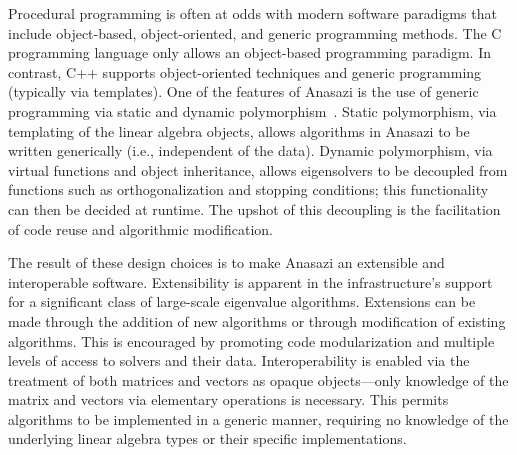 \documentclass[acmtoms]{acmtrans2m}
\newcounter{algorithm}
\begin{document}
Procedural programming is often at odds with modern software
paradigms that include object-based, object-oriented, and generic
programming methods. The C programming language only allows an
object-based programming paradigm. In contrast, C++ supports
object-oriented techniques and generic programming (typically via
templates). One of the features of Anasazi is the use of generic
programming via static and dynamic polymorphism~\cite[Chapter
14]{VJ02}. Static polymorphism, via templating of the linear algebra
objects, allows algorithms in Anasazi to be written generically
(i.e., independent of the data). Dynamic polymorphism, via virtual
functions and object inheritance, allows eigensolvers to be
decoupled from functions such as orthogonalization and stopping
conditions; this functionality can then be decided at runtime. The
upshot of this decoupling is the facilitation of code reuse and
algorithmic modification.



The result of these design choices is to make Anasazi an extensible
and interoperable software. Extensibility is apparent in the
infrastructure's support for a significant class of large-scale
eigenvalue algorithms. Extensions can be made through the addition of
new algorithms or through modification of existing algorithms. This is
encouraged by promoting code modularization and multiple levels of
access to solvers and their data. Interoperability is enabled via the
treatment of both matrices and vectors as opaque objects---only
knowledge of the matrix and vectors via elementary operations is
necessary. This permits algorithms to be implemented in a generic
manner, requiring no knowledge of the underlying linear algebra types
or their specific implementations.
\end{document}

